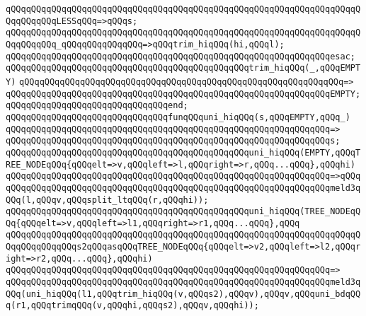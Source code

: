 \verb|qQQqqQQqqQQqqQQqqQQqqQQqqQQqqQQqqQQqqQQqqQQqqQQqqQQqqQQqqQQqqQQqqQQqqQQqqQQqqQQqLESSqQQq=>qQQqs;|\newline
\verb|qQQqqQQqqQQqqQQqqQQqqQQqqQQqqQQqqQQqqQQqqQQqqQQqqQQqqQQqqQQqqQQqqQQqqQQqqQQqqQQq_qQQqqQQqqQQqqQQq=>qQQqtrim_hiqQQq(hi,qQQql);|\newline
\verb|qQQqqQQqqQQqqQQqqQQqqQQqqQQqqQQqqQQqqQQqqQQqqQQqqQQqqQQqqQQqqQQqesac;|\newline
\newline
\verb|qQQqqQQqqQQqqQQqqQQqqQQqqQQqqQQqqQQqqQQqqQQqqQQqtrim_hiqQQq(_,qQQqEMPTY)|\newline
\verb|qQQqqQQqqQQqqQQqqQQqqQQqqQQqqQQqqQQqqQQqqQQqqQQqqQQqqQQqqQQqqQQq=>|\newline
\verb|qQQqqQQqqQQqqQQqqQQqqQQqqQQqqQQqqQQqqQQqqQQqqQQqqQQqqQQqqQQqqQQqEMPTY;|\newline
\verb|qQQqqQQqqQQqqQQqqQQqqQQqqQQqqQQqend;|\newline
\newline
\newline
\verb|qQQqqQQqqQQqqQQqqQQqqQQqqQQqqQQqfunqQQquni_hiqQQq(s,qQQqEMPTY,qQQq_)|\newline
\verb|qQQqqQQqqQQqqQQqqQQqqQQqqQQqqQQqqQQqqQQqqQQqqQQqqQQqqQQqqQQqqQQq=>|\newline
\verb|qQQqqQQqqQQqqQQqqQQqqQQqqQQqqQQqqQQqqQQqqQQqqQQqqQQqqQQqqQQqqQQqs;|\newline
\newline
\verb|qQQqqQQqqQQqqQQqqQQqqQQqqQQqqQQqqQQqqQQqqQQqqQQquni_hiqQQq(EMPTY,qQQqTREE_NODEqQQq{qQQqelt=>v,qQQqleft=>l,qQQqright=>r,qQQq...qQQq},qQQqhi)|\newline
\verb|qQQqqQQqqQQqqQQqqQQqqQQqqQQqqQQqqQQqqQQqqQQqqQQqqQQqqQQqqQQqqQQq=>qQQq|\newline
\verb|qQQqqQQqqQQqqQQqqQQqqQQqqQQqqQQqqQQqqQQqqQQqqQQqqQQqqQQqqQQqqQQqmeld3qQQq(l,qQQqv,qQQqsplit_ltqQQq(r,qQQqhi));|\newline
\newline
\verb|qQQqqQQqqQQqqQQqqQQqqQQqqQQqqQQqqQQqqQQqqQQqqQQquni_hiqQQq(TREE_NODEqQQq{qQQqelt=>v,qQQqleft=>l1,qQQqright=>r1,qQQq...qQQq},qQQq|\newline
\verb|qQQqqQQqqQQqqQQqqQQqqQQqqQQqqQQqqQQqqQQqqQQqqQQqqQQqqQQqqQQqqQQqqQQqqQQqqQQqqQQqqQQqs2qQQqasqQQqTREE_NODEqQQq{qQQqelt=>v2,qQQqleft=>l2,qQQqright=>r2,qQQq...qQQq},qQQqhi)|\newline
\verb|qQQqqQQqqQQqqQQqqQQqqQQqqQQqqQQqqQQqqQQqqQQqqQQqqQQqqQQqqQQqqQQq=>|\newline
\verb|qQQqqQQqqQQqqQQqqQQqqQQqqQQqqQQqqQQqqQQqqQQqqQQqqQQqqQQqqQQqqQQqmeld3qQQq(uni_hiqQQq(l1,qQQqtrim_hiqQQq(v,qQQqs2),qQQqv),qQQqv,qQQquni_bdqQQq(r1,qQQqtrimqQQq(v,qQQqhi,qQQqs2),qQQqv,qQQqhi));|\newline
